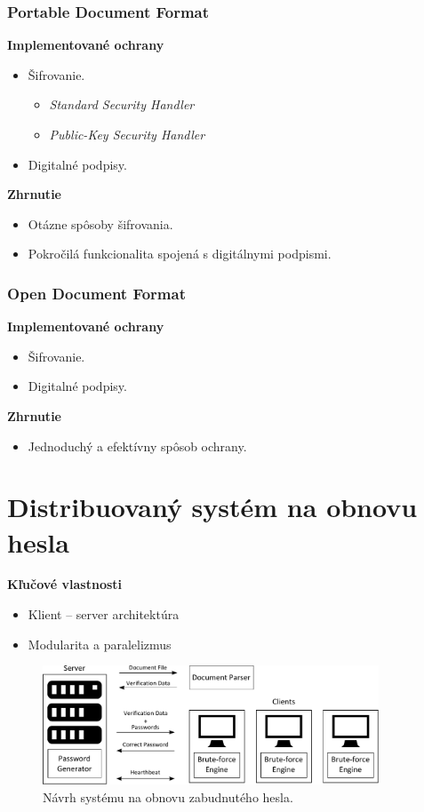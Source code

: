 \documentclass[xcolor=dvipsnames]{beamer}
\def\itemtitle#1{{\bfseries#1\smallskip}}
\begin{document}
\begin{frame}
	\frametitle{Portable Document Format}
	\itemtitle{Implementované ochrany}
	\begin{itemize}
		\item Šifrovanie.
		\begin{itemize}
			\item \textit{Standard Security Handler}
			\item \textit{Public-Key Security Handler}	
		\end{itemize}
		\item Digitalné podpisy.
	\end{itemize}
	\bigskip
	\itemtitle{Zhrnutie}
	\begin{itemize}
		\item Otázne spôsoby šifrovania.  
		\item Pokročilá funkcionalita spojená s digitálnymi podpismi. 
	\end{itemize}
	

\end{frame}


\begin{frame}
	\frametitle{Open Document Format}
	\itemtitle{Implementované ochrany}
	\begin{itemize}
		\item Šifrovanie.
		\item Digitalné podpisy.
	\end{itemize}
	\bigskip
	\itemtitle{Zhrnutie}
	\begin{itemize}
		\item Jednoduchý a efektívny spôsob ochrany.  
	\end{itemize}
\end{frame}


\section{Distribuovaný systém na obnovu hesla}
\begin{frame}
	\itemtitle{Kľučové vlastnosti}
	\begin{itemize}
		\item Klient -- server architektúra
		\item Modularita a paralelizmus
	\end{itemize}
	\bigskip
	\begin{figure}[h]
		\centering
		\includegraphics[width=100mm]{images/ddpbf_design.pdf} \\	
		\bigskip
		\scriptsize{Návrh systému na obnovu zabudnutého hesla.}	
	\end{figure}
\end{frame}
\end{document}
